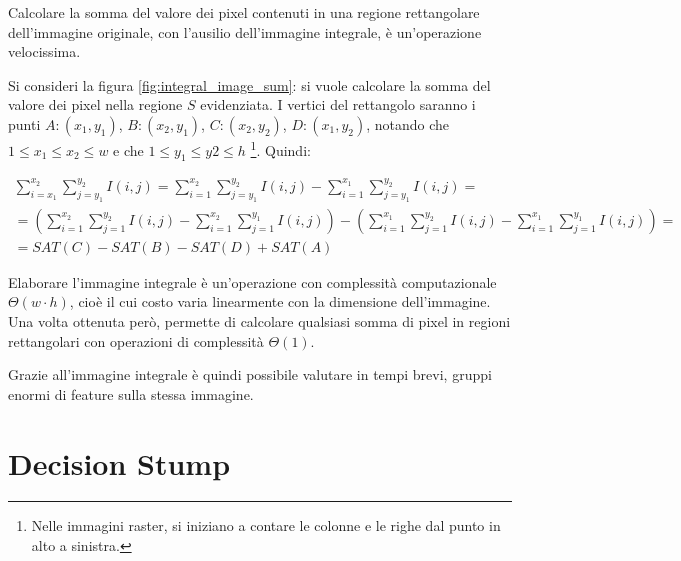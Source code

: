 Calcolare la somma del valore dei pixel contenuti in una regione rettangolare dell'immagine originale, con l'ausilio dell'immagine integrale, è un'operazione velocissima.

Si consideri la figura \ref{fig:integral_image_sum}: si vuole calcolare la somma del valore dei pixel nella regione $S$ evidenziata. I vertici del rettangolo saranno i punti $A:(x_1,y_1)$, $B:(x_2,y_1)$, $C:(x_2,y_2)$, $D:(x_1, y_2)$, notando che $1 \leq x_1 \leq x_2 \leq w$ e che $1 \leq y_1 \leq y2 \leq h$ \footnote{Nelle immagini raster, si iniziano a contare le colonne e le righe dal punto in alto a sinistra.}.
Quindi:

\begin{align*}
    \sum_{i = x_1}^{x_2} \sum_{j = y_1}^{y_2} I(i,j) =
    \sum_{i = 1}^{x_2} \sum_{j = y_1}^{y_2} I(i,j) - \sum_{i = 1}^{x_1} \sum_{j = y_1}^{y_2} I(i,j) = \\
    =
    \left(
    \sum_{i = 1}^{x_2} \sum_{j = 1}^{y_2} I(i,j) -
    \sum_{i = 1}^{x_2} \sum_{j = 1}^{y_1} I(i,j)
    \right)
    -
    \left(
    \sum_{i = 1}^{x_1} \sum_{j = 1}^{y_2} I(i,j) -
    \sum_{i = 1}^{x_1} \sum_{j = 1}^{y_1} I(i,j)
    \right) = \\
    = SAT(C) - SAT(B) - SAT(D) + SAT(A)
\end{align*}

Elaborare l'immagine integrale è un'operazione con complessità computazionale $\Theta(w \cdot h)$, cioè il cui costo varia linearmente con la dimensione dell'immagine. Una volta ottenuta però, permette di calcolare qualsiasi somma di pixel in regioni rettangolari con operazioni di complessità $\Theta(1)$.

Grazie all'immagine integrale è quindi possibile valutare in tempi brevi, gruppi enormi di feature sulla stessa immagine.


\section{Decision Stump}
\label{sec:decision_stump}
